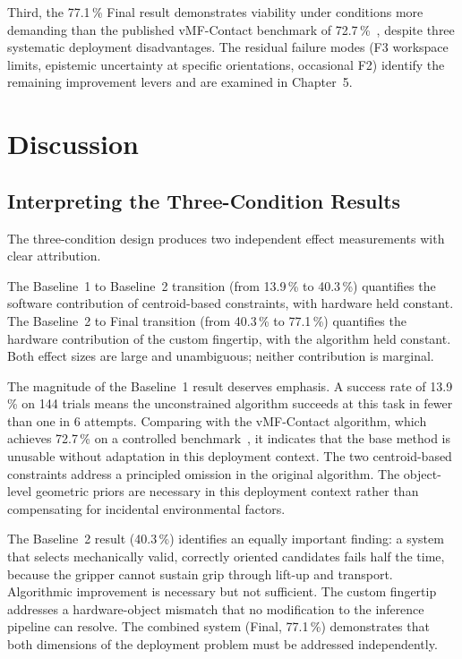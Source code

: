 \documentclass[12pt, a4paper]{report}
\begin{document}
Third, the 77.1\,\% Final result demonstrates viability under conditions more demanding than the published vMF-Contact benchmark of 72.7\,\%~\cite{shi2025}, despite three systematic deployment disadvantages. The residual failure modes (F3 workspace limits, epistemic uncertainty at specific orientations, occasional F2) identify the remaining improvement levers and are examined in Chapter~5.


\chapter{Discussion}
\label{chap:discussion}

\section{Interpreting the Three-Condition Results}

The three-condition design produces two independent effect measurements with clear attribution. 

The Baseline~1 to Baseline~2 transition (from 13.9\,\% to 40.3\,\%) quantifies the software contribution of centroid-based constraints, with hardware held constant. The Baseline~2 to Final transition (from 40.3\,\% to 77.1\,\%) quantifies the hardware contribution of the custom fingertip, with the algorithm held constant. Both effect sizes are large and unambiguous; neither contribution is marginal.

The magnitude of the Baseline~1 result deserves emphasis. A success rate of 13.9\,\% on 144 trials means the unconstrained algorithm succeeds at this task in fewer than one in 6 attempts. Comparing with the vMF-Contact algorithm, which achieves 72.7\,\% on a controlled benchmark~\cite{shi2025}, it indicates that the base method is unusable without adaptation in this deployment context. The two centroid-based constraints address a principled omission in the original algorithm. The object-level geometric priors are necessary in this deployment context rather than compensating for incidental environmental factors.

The Baseline~2 result (40.3\,\%) identifies an equally important finding: a system that selects mechanically valid, correctly oriented candidates fails half the time, because the gripper cannot sustain grip through lift-up and transport. Algorithmic improvement is necessary but not sufficient. 
The custom fingertip addresses a hardware-object mismatch that no modification to the inference pipeline can resolve. The combined system (Final, 77.1\,\%) demonstrates that both dimensions of the deployment problem must be addressed independently.
\end{document}

